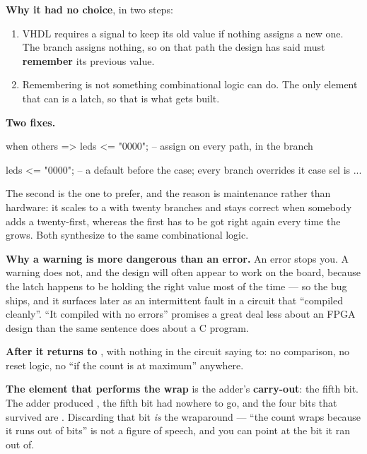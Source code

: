 \textbf{Why it had no choice}, in two steps:
\begin{enumerate}
  \item VHDL requires a signal to keep its old value if nothing assigns a new one. The
     branch assigns nothing, so on that path the design has said  must
    \textbf{remember} its previous value.
  \item Remembering is not something combinational logic can do. The only element that can is a
    latch, so that is what gets built.
\end{enumerate}

\textbf{Two fixes.}

\begin{vhdlcode}
        when others => leds <= "0000";      -- assign on every path, in the branch
\end{vhdlcode}

\begin{vhdlcode}
    leds <= "0000";                          -- a default before the case; every branch overrides it
    case sel is
        ...
\end{vhdlcode}

The second is the one to prefer, and the reason is maintenance rather than hardware: it scales to a
 with twenty branches and stays correct when somebody adds a twenty-first, whereas the
first has to be got right again every time the  grows. Both synthesize to the same
combinational logic.

\textbf{Why a warning is more dangerous than an error.} An error stops you. A warning does not, and
the design will often appear to work on the board, because the latch happens to be holding the
right value most of the time --- so the bug ships, and it surfaces later as an intermittent fault in
a circuit that ``compiled cleanly''. ``It compiled with no errors'' promises a great deal less about
an FPGA design than the same sentence does about a C program. 


\textbf{After  it returns to }, with nothing in the circuit saying to: no
comparison, no reset logic, no ``if the count is at maximum'' anywhere.

\textbf{The element that performs the wrap} is the adder's \textbf{carry-out}: the fifth bit. The
adder produced , the fifth bit had nowhere to go, and the four bits that survived are
. Discarding that bit \emph{is} the wraparound --- ``the count wraps because it runs out
of bits'' is not a figure of speech, and you can point at the bit it ran out of. 

